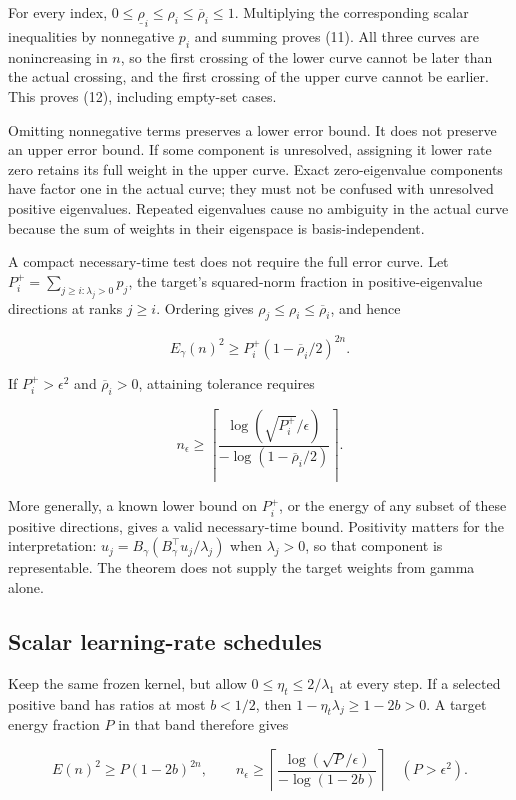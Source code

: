 \documentclass[11pt]{article}
\begin{document}
For every index, \(0\le\underline\rho_i\le\rho_i\le\overline\rho_i\le1\). Multiplying the corresponding scalar inequalities by nonnegative \(p_i\) and summing proves (11). All three curves are nonincreasing in \(n\), so the first crossing of the lower curve cannot be later than the actual crossing, and the first crossing of the upper curve cannot be earlier. This proves (12), including empty-set cases.

Omitting nonnegative terms preserves a lower error bound. It does not preserve an upper error bound. If some component is unresolved, assigning it lower rate zero retains its full weight in the upper curve. Exact zero-eigenvalue components have factor one in the actual curve; they must not be confused with unresolved positive eigenvalues. Repeated eigenvalues cause no ambiguity in the actual curve because the sum of weights in their eigenspace is basis-independent.

A compact necessary-time test does not require the full error curve. Let \(P_i^+=\sum_{j\ge i:\lambda_j>0}p_j\), the target's squared-norm fraction in positive-eigenvalue directions at ranks \(j\ge i\). Ordering gives \(\rho_j\le\rho_i\le\overline\rho_i\), and hence

\[
E_\gamma(n)^2\ge P_i^+(1-\overline\rho_i/2)^{2n}.
\]

If \(P_i^+>\epsilon^2\) and \(\overline\rho_i>0\), attaining tolerance requires

\[
n_\epsilon\ge
\left\lceil
\frac{\log(\sqrt{P_i^+}/\epsilon)}{-\log(1-\overline\rho_i/2)}
\right\rceil.
\tag{E1}
\]

More generally, a known lower bound on \(P_i^+\), or the energy of any subset of these positive directions, gives a valid necessary-time bound. Positivity matters for the interpretation: \(u_j=B_\gamma(B_\gamma^\top u_j/\lambda_j)\) when \(\lambda_j>0\), so that component is representable. The theorem does not supply the target weights from gamma alone.

\subsection{Scalar learning-rate schedules}

Keep the same frozen kernel, but allow \(0\le\eta_t\le2/\lambda_1\) at every step. If a selected positive band has ratios at most \(b<1/2\), then \(1-\eta_t\lambda_j\ge1-2b>0\). A target energy fraction \(P\) in that band therefore gives

\[
E(n)^2\ge P(1-2b)^{2n},
\qquad
n_\epsilon\ge
\left\lceil\frac{\log(\sqrt P/\epsilon)}{-\log(1-2b)}\right\rceil
\quad(P>\epsilon^2).
\]
\end{document}
